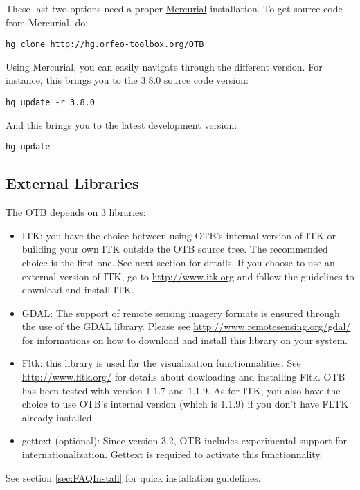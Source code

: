 These last two options need a proper \href{http://mercurial.selenic.com}{Mercurial} installation. To get source code from Mercurial, do:
\begin{verbatim}
hg clone http://hg.orfeo-toolbox.org/OTB
\end{verbatim}

Using Mercurial, you can easily navigate through the different version. For instance, this brings you to the 3.8.0 source code version:
\begin{verbatim}
hg update -r 3.8.0
\end{verbatim}

And this brings you to the latest development version:
\begin{verbatim}
hg update
\end{verbatim}


\subsection{External Libraries}

The OTB depends on 3 libraries:
\begin{itemize}
  \item ITK: you have the choice between using OTB's internal version
  of ITK or building your own ITK outside the OTB source tree. The
  recommended choice is the first one. See next section for
  details. If you choose to use an external version of ITK, go to
  \url{http://www.itk.org} and follow the guidelines to download and
  install ITK.
  \item GDAL: The support of remote sensing imagery formats is ensured
    through the use of the GDAL library. Please see
\url{http://www.remotesensing.org/gdal/} for informations on how to
download and install this library on your system.
\item Fltk: this library is used for the visualization
  functionnalities. See \url{http://www.fltk.org/} for details about
  dowloading and installing Fltk. OTB has been tested with version 1.1.7
  and 1.1.9. As for ITK, you also have the choice to use OTB's internal
  version (which is 1.1.9) if you don't have FLTK already installed.
\item gettext (optional): Since version 3.2, OTB includes experimental support 
  for internationalization. Gettext is required to activate this 
  functionnality.  
\end{itemize}

See section \ref{sec:FAQInstall} for quick installation guidelines.

